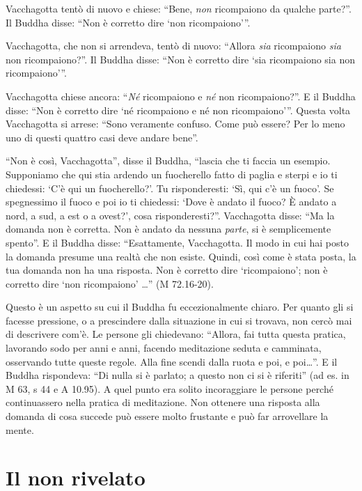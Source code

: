 Vacchagotta tentò di nuovo e chiese: ``Bene, \textit{non }ricompaiono da qualche parte?''. Il Buddha disse: ``Non è corretto dire `non ricompaiono'\thinspace''.

Vacchagotta, che non si arrendeva, tentò di nuovo: ``Allora \textit{sia} ricompaiono \textit{sia} non ricompaiono?''. Il Buddha disse: ``Non è corretto dire `sia ricompaiono sia non ricompaiono'\thinspace''.

Vacchagotta chiese ancora: ``\textit{Né} ricompaiono e \textit{né }non ricompaiono?''. E il Buddha disse: ``Non è corretto dire `né ricompaiono e né non ricompaiono'\thinspace''. Questa volta Vacchagotta si arrese: ``Sono veramente confuso. Come può essere? Per lo meno uno di questi quattro casi deve andare bene''.

``Non è così, Vacchagotta'', disse il Buddha, ``lascia che ti faccia un esempio. Supponiamo che qui stia ardendo un fuocherello fatto di paglia e sterpi e io ti chiedessi: `C'è qui un fuocherello?'. Tu risponderesti: `Sì, qui c'è un fuoco'. Se spegnessimo il fuoco e poi io ti chiedessi: `Dove è andato il fuoco? È andato a nord, a sud, a est o a ovest?', cosa risponderesti?''. Vacchagotta disse: ``Ma la domanda non è corretta. Non è andato da nessuna\textit{ parte}, si è semplicemente spento''. E il Buddha disse: ``Esattamente, Vacchagotta. Il modo in cui hai posto la domanda presume una realtà che non esiste. Quindi, così come è stata posta, la tua domanda non ha una risposta. Non è corretto dire `ricompaiono'; non è corretto dire `non ricompaiono' \ldots{}'' (M 72.16-20).

Questo è un aspetto su cui il Buddha fu eccezionalmente chiaro. Per quanto gli si facesse pressione, o a prescindere dalla situazione in cui si trovava, non cercò mai di descrivere com'è. Le persone gli chiedevano: ``Allora, fai tutta questa pratica, lavorando sodo per anni e anni, facendo meditazione seduta e camminata, osservando tutte queste regole. Alla fine scendi dalla ruota e poi, e poi\ldots{}''. E il Buddha rispondeva: ``Di nulla si è parlato; a questo non ci si è riferiti'' (ad es. in M 63, s 44 e A 10.95). A quel punto era solito incoraggiare le persone perché continuassero nella pratica di meditazione. Non ottenere una risposta alla domanda di cosa succede può essere molto frustante e può far arrovellare la mente.

\section*{Il non rivelato}

